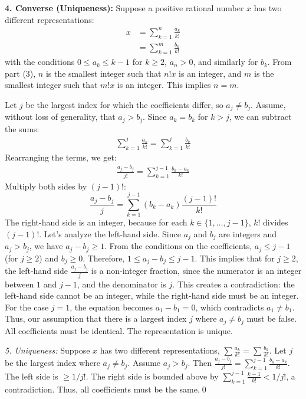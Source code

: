 \textbf{4. Converse (Uniqueness):}
Suppose a positive rational number $x$ has two different representations:
\begin{align*}
x &= \sum_{k=1}^n \frac{a_k}{k!}\\
&= \sum_{k=1}^m \frac{b_k}{k!}
\end{align*}
with the conditions $0 \le a_k \le k-1$ for $k \ge 2$, $a_n > 0$, and similarly for $b_k$.
From part (3), $n$ is the smallest integer such that $n!x$ is an integer, and $m$ is the smallest integer such that $m!x$ is an integer. This implies $n=m$.

Let $j$ be the largest index for which the coefficients differ, so $a_j \neq b_j$. Assume, without loss of generality, that $a_j > b_j$.
Since $a_k = b_k$ for $k > j$, we can subtract the sums:
\begin{align*}
\sum_{k=1}^j \frac{a_k}{k!} = \sum_{k=1}^j \frac{b_k}{k!}
\end{align*}
Rearranging the terms, we get:
\begin{align*}
\frac{a_j - b_j}{j!} = \sum_{k=1}^{j-1} \frac{b_k - a_k}{k!}
\end{align*}
Multiply both sides by $(j-1)!$:
\[ \frac{a_j - b_j}{j} = \sum_{k=1}^{j-1} (b_k - a_k) \frac{(j-1)!}{k!} \]
The right-hand side is an integer, because for each $k \in \{1, \dots, j-1\}$, $k!$ divides $(j-1)!$.
Let's analyze the left-hand side. Since $a_j$ and $b_j$ are integers and $a_j > b_j$, we have $a_j - b_j \geq 1$.
From the conditions on the coefficients, $a_j \leq j-1$ (for $j \ge 2$) and $b_j \geq 0$.
Therefore, $1 \leq a_j - b_j \leq j-1$.
This implies that for $j \ge 2$, the left-hand side $\frac{a_j - b_j}{j}$ is a non-integer fraction, since the numerator is an integer between $1$ and $j-1$, and the denominator is $j$.
This creates a contradiction: the left-hand side cannot be an integer, while the right-hand side must be an integer.
For the case $j=1$, the equation becomes $a_1 - b_1 = 0$, which contradicts $a_1 \neq b_1$.
Thus, our assumption that there is a largest index $j$ where $a_j \neq b_j$ must be false. All coefficients must be identical. The representation is unique.

\textit{5. Uniqueness:} Suppose $x$ has two different representations, $\sum \frac{a_k}{k!} = \sum \frac{b_k}{k!}$. Let $j$ be the largest index where $a_j \neq b_j$. Assume $a_j > b_j$. Then $\frac{a_j - b_j}{j!} = \sum_{k=1}^{j-1} \frac{b_k - a_k}{k!}$. The left side is $\ge 1/j!$. The right side is bounded above by $\sum_{k=1}^{j-1} \frac{k-1}{k!} < 1/j!$, a contradiction. Thus, all coefficients must be the same.\qed
